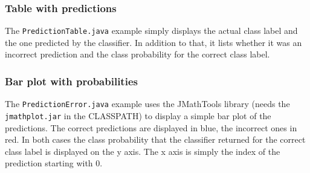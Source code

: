 \subsubsection*{Table with predictions}
The \texttt{PredictionTable.java} example simply displays the actual class label
and the one predicted by the classifier. In addition to that, it lists whether
it was an incorrect prediction and the class probability for the correct class
label.
\begin{center}
\end{center}

\newpage
\subsubsection*{Bar plot with probabilities}
The \texttt{PredictionError.java} example uses the JMathTools library (needs
the \texttt{jmathplot.jar} \cite{jmathplot} in the CLASSPATH) to display a
simple bar plot of the
predictions. The correct predictions are displayed in blue, the incorrect ones
in red. In both cases the class probability that the classifier returned for the
correct class label is displayed on the y axis. The x axis is simply the index
of the prediction starting with 0.
\begin{center}
\end{center}
